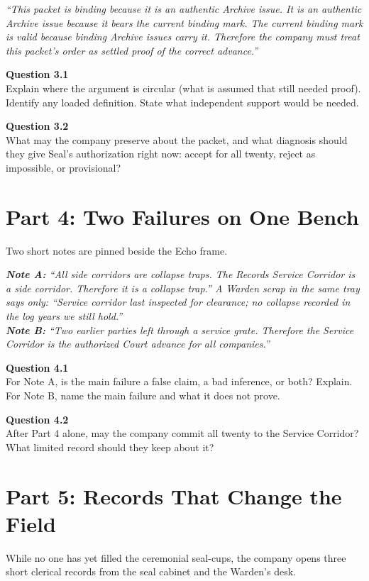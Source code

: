 \documentclass[12pt]{article}
\newcommand{\cluebox}[1]{\par\vspace{0.12em}\noindent\begin{minipage}{\textwidth}\itshape #1\end{minipage}\par\vspace{0.12em}}
\begin{document}
\cluebox{``This packet is binding because it is an authentic Archive issue. It is an authentic Archive issue because it bears the current binding mark. The current binding mark is valid because binding Archive issues carry it. Therefore the company must treat this packet's order as settled proof of the correct advance.''}

\textbf{Question 3.1}\\[-0.15em]
Explain where the argument is circular (what is assumed that still needed proof). Identify any loaded definition. State what independent support would be needed.

\textbf{Question 3.2}\\[-0.15em]
What may the company preserve about the packet, and what diagnosis should they give Seal's authorization right now: accept for all twenty, reject as impossible, or provisional?

\newpage
\section*{Part 4: Two Failures on One Bench}
Two short notes are pinned beside the Echo frame.

\cluebox{\textbf{Note A:} ``All side corridors are collapse traps. The Records Service Corridor is a side corridor. Therefore it is a collapse trap.'' A Warden scrap in the same tray says only: ``Service corridor last inspected for clearance; no collapse recorded in the log years we still hold.''\\[0.25em]
\textbf{Note B:} ``Two earlier parties left through a service grate. Therefore the Service Corridor is the authorized Court advance for all companies.''}

\textbf{Question 4.1}\\[-0.15em]
For Note A, is the main failure a false claim, a bad inference, or both? Explain. For Note B, name the main failure and what it does not prove.

\textbf{Question 4.2}\\[-0.15em]
After Part 4 alone, may the company commit all twenty to the Service Corridor? What limited record should they keep about it?

\newpage
\section*{Part 5: Records That Change the Field}
While no one has yet filled the ceremonial seal-cups, the company opens three short clerical records from the seal cabinet and the Warden's desk.
\end{document}

